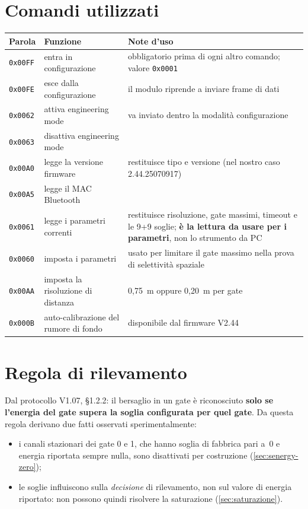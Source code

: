 \section{Comandi utilizzati}

\begin{center}\small
\begin{tabularx}{\textwidth}{@{}llX@{}}
\toprule
\textbf{Parola} & \textbf{Funzione} & \textbf{Note d'uso} \\
\midrule
\texttt{0x00FF} & entra in configurazione & obbligatorio prima di ogni altro
  comando; valore \texttt{0x0001} \\
\texttt{0x00FE} & esce dalla configurazione & il modulo riprende a inviare frame di
  dati \\
\texttt{0x0062} & attiva engineering mode & va inviato dentro la modalità
  configurazione \\
\texttt{0x0063} & disattiva engineering mode & \\
\texttt{0x00A0} & legge la versione firmware & restituisce tipo e versione
  (nel nostro caso 2.44.25070917) \\
\texttt{0x00A5} & legge il MAC Bluetooth & \\
\texttt{0x0061} & legge i parametri correnti & restituisce risoluzione, gate massimi,
  timeout e le 9+9 soglie; \textbf{è la lettura da usare per i parametri}, non lo
  strumento da PC \\
\texttt{0x0060} & imposta i parametri & usato per limitare il gate massimo nella prova
  di selettività spaziale \\
\texttt{0x00AA} & imposta la risoluzione di distanza & 0,75~m oppure 0,20~m per gate \\
\texttt{0x000B} & auto-calibrazione del rumore di fondo & disponibile dal firmware
  V2.44~\cite{hilinkV244} \\
\bottomrule
\end{tabularx}
\end{center}

\section{Regola di rilevamento}

Dal protocollo V1.07, \S1.2.2: il bersaglio in un gate è riconosciuto
\textbf{solo se l'energia del gate supera la soglia configurata per quel gate}. Da
questa regola derivano due fatti osservati sperimentalmente:

\begin{itemize}[leftmargin=1.4em,itemsep=2pt]
  \item i canali stazionari dei gate 0 e 1, che hanno soglia di fabbrica pari a~0 e
        energia riportata sempre nulla, sono disattivati per costruzione
        (\cref{sec:senergy-zero});
  \item le soglie influiscono sulla \emph{decisione} di rilevamento, non sul valore
        di energia riportato: non possono quindi risolvere la saturazione
        (\cref{sec:saturazione}).
\end{itemize}

